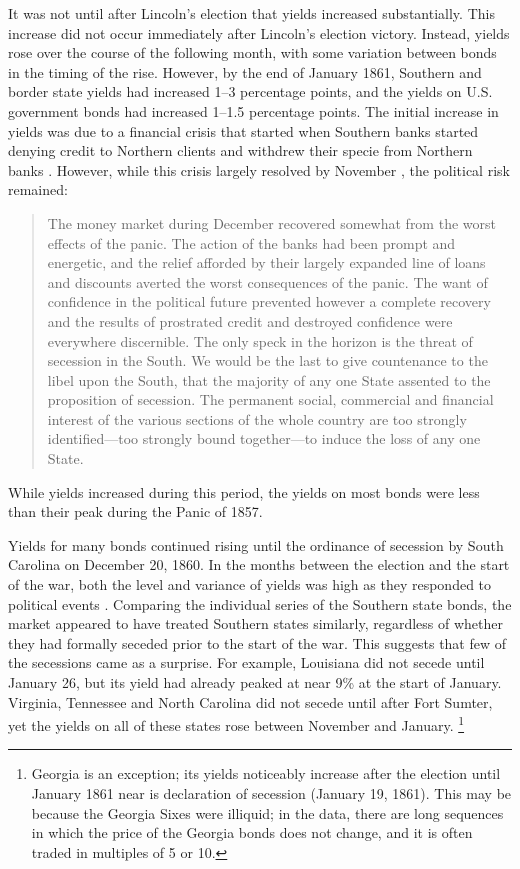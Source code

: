 It was not until after Lincoln's election that yields increased substantially.
This increase did not occur immediately after Lincoln's election victory.
Instead, yields rose over the course of the following month, with some variation between bonds in the timing of the rise.
However, by the end of January 1861, Southern and border state yields had increased 1--3 percentage points, and the yields on U.S. government bonds had increased 1--1.5 percentage points.
The initial increase in yields was due to a financial crisis that started when Southern banks started denying credit to Northern clients and withdrew their specie from Northern banks \parencite[76]{HomansDana1861a}.
However, while this crisis largely resolved by November \parencite[539-542]{BankersMagazine1860}, the political risk remained:
\begin{quote}
  The money market during December recovered somewhat from the worst effects of the panic.
  The action of the banks had been prompt and energetic, and the relief afforded by their largely expanded line of loans and discounts averted the worst consequences of the panic.
  The want of confidence in the political future prevented however a complete recovery and the results of prostrated credit and destroyed confidence were everywhere discernible. \parencite[December 1860,][541]{BankersMagazine1860}
  The only speck in the horizon is the threat of secession in the South.
  We would be the last to give countenance to the libel upon the South, that the majority of any one State assented to the proposition of secession.
  The permanent social, commercial and financial interest of the various sections of the whole country are too strongly identified---too strongly bound together---to induce the loss of any one State. \parencites[January 1860,][419]{BankersMagazine1860}
\end{quote}
While yields increased during this period, the yields on most bonds were less than their peak during the Panic of 1857.

Yields for many bonds continued rising until the ordinance of secession by South Carolina on December 20, 1860.
In the months between the election and the start of the war, both the level and variance of yields was high as they responded to political events \parencites[718]{HuntKettellHomansEtAl1860}[78,198,416,677]{HomansDana1861a}[413,481,669,756,838]{BankersMagazine1860}.%
Comparing the individual series of the Southern state bonds, the market appeared to have treated Southern states similarly, regardless of whether they had formally seceded prior to the start of the war.
This suggests that few of the secessions came as a surprise.
For example, Louisiana did not secede until January 26, but its yield had already peaked at near 9\% at the start of January.
Virginia, Tennessee and North Carolina did not secede until after Fort Sumter, yet the yields on all of these states rose between November and January.%
\footnote{Georgia is an exception; its yields noticeably increase after the election until January 1861 near is declaration of secession (January 19, 1861).
This may be because the Georgia Sixes were illiquid; in the data, there are long sequences in which the price of the Georgia bonds does not change, and it is often traded in multiples of 5 or 10.
}

